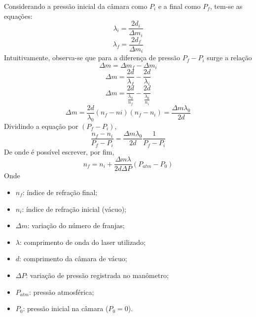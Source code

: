 	Considerando a pressão inicial da câmara como $P_{i}$ e a final como $P_{f}$, tem-se as equações:
\begin{equation}
\lambda_{i} = \frac{2d_{i}}{\Delta m_{i}}
\label{eq:lbd}
\end{equation}
\begin{equation}
\lambda_{f} = \frac{2d_{f}}{\Delta m_{i}}
\end{equation}
	Intuitivamente, observa-se que para a diferença de pressão $P_{f}-P_{i}$ surge a relação
\begin{equation}
\Delta m = \Delta m_{f} - \Delta m_{i}
\end{equation}
\begin{equation}
\Delta m = \frac{2d}{\lambda_{f}} - \frac{2d}{\lambda_{i}}
\end{equation}
\begin{equation}
\Delta m = \frac{2d}{\frac{\lambda_{0}}{n_{f}}} - \frac{2d}{\frac{\lambda_{0}}{n_{i}}}
\end{equation}
\begin{equation}
\Delta m = \frac{2d}{\lambda_{0}}(n_{f}-n{i})
(n_{f}-n_{i}) = \frac{\Delta m \lambda_{0}}{2d}
\end{equation}
	Dividindo a equação por $(P_{f}-P_{i})$,
\begin{equation}
\frac{n_{f}-n_{i}}{P_{f}-P_{i}} = \frac{\Delta m \lambda_{0}}{2d} \frac{1}{P_{f}-P_{i}}
\end{equation}
	De onde é possível escrever, por fim,
\begin{equation}
n_{f} = n_{i} + \frac{\Delta m \lambda}{2d \Delta P} (P_{atm}-P_{0})
\label{eq:ni}
\end{equation}
	Onde
\begin{itemize}
\item $n_{f}$: índice de refração final;
\item $n_{i}$: índice de refração inicial (vácuo);
\item $\Delta m$: variação do número de franjas;
\item $\lambda$: comprimento de onda do laser utilizado;
\item $d$: comprimento da câmara de vácuo;
\item $\Delta P$: variação de pressão registrada no manômetro;
\item $P_{atm}$: pressão atmosférica;
\item $P_{0}$: pressão inicial na câmara ($P_{0} = 0$).
\end{itemize}



